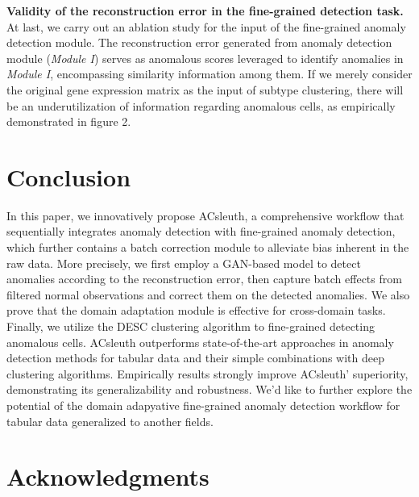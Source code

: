 \documentclass{article}
\begin{document}
\textbf{Validity of the reconstruction error in the fine-grained detection task.}	At last, we carry out an 
ablation study for the input of the fine-grained anomaly detection module. The 
reconstruction error generated from anomaly detection module (\textit{Module I}) serves as 
anomalous scores leveraged to identify anomalies in \textit{Module I}, encompassing similarity 
information among them. If we merely consider the original gene expression matrix as the 
input of subtype clustering, there will be an underutilization of information regarding 
anomalous cells, as empirically demonstrated in figure 2.
\section{Conclusion}
In this paper, we innovatively propose ACsleuth, a comprehensive workflow that sequentially 
integrates anomaly detection with fine-grained anomaly detection, which further contains a batch 
correction module to alleviate bias inherent in the raw data. More precisely, we first 
employ a GAN-based model to detect anomalies according to the reconstruction error, then 
capture batch effects from filtered normal observations and correct them on the detected 
anomalies. We also prove that the domain adaptation module is effective for cross-domain tasks. 
Finally, we utilize the DESC clustering algorithm to fine-grained detecting anomalous cells. 
ACsleuth outperforms state-of-the-art approaches in anomaly detection methods for tabular 
data and their simple combinations with deep clustering algorithms. Empirically results 
strongly improve ACsleuth’ superiority, demonstrating its generalizability and robustness. 
We’d like to further explore the potential of the domain adapyative fine-grained anomaly 
detection workflow for tabular data generalized to another fields.
\section*{Acknowledgments}





\end{document}
